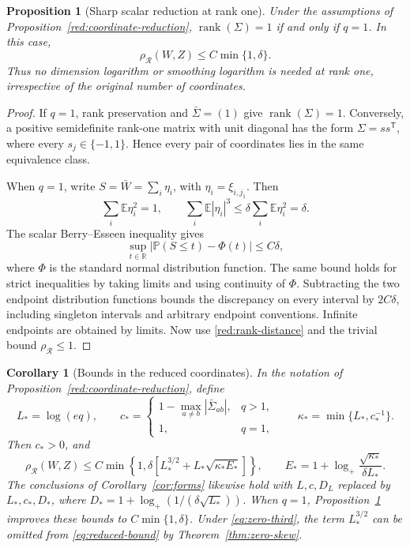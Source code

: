 \documentclass[11pt,a4paper]{article}
\newtheorem{proposition}{Proposition}
\newtheorem{corollary}{Corollary}
\theoremstyle{remark}
\newcommand{\E}{\mathbb E}
\newcommand{\Pp}{\mathbb P}
\newcommand{\R}{\mathbb R}
\newcommand{\rh}{\rho_{\mathcal R}}
\begin{document}
\begin{proposition}[Sharp scalar reduction at rank one]
\label{red:rank-one}
Under the assumptions of Proposition~\ref{red:coordinate-reduction},
\(\operatorname{rank}(\Sigma)=1\) if and only if \(q=1\).  In this case,
\begin{equation}
 \rh(W,Z)\le C\min\{1,\delta\}.
 \label{red:scalar-rate}
\end{equation}
Thus no dimension logarithm or smoothing logarithm is needed at rank
one, irrespective of the original number of coordinates.
\end{proposition}

\begin{proof}
If \(q=1\), rank preservation and \(\bar\Sigma=(1)\) give
\(\operatorname{rank}(\Sigma)=1\).  Conversely, a positive semidefinite
rank-one matrix with unit diagonal has the form
\(\Sigma=ss^{\mathsf T}\), where every \(s_j\in\{-1,1\}\).
Hence every pair of coordinates lies in the same equivalence class.

When \(q=1\), write \(S=\bar W=\sum_i\eta_i\), with
\(\eta_i=\xi_{i,j_1}\).  Then
\[
 \sum_i\E\eta_i^2=1,\qquad
 \sum_i\E|\eta_i|^3
 \le\delta\sum_i\E\eta_i^2=\delta.
\]
The scalar Berry--Esseen inequality gives
\[
 \sup_{t\in\R}|\Pp(S\le t)-\Phi(t)|\le C\delta,
\]
where \(\Phi\) is the standard normal distribution function.  The same
bound holds for strict inequalities by taking limits and using
continuity of \(\Phi\).  Subtracting the two endpoint distribution
functions bounds the discrepancy on every interval by \(2C\delta\),
including singleton intervals and arbitrary endpoint conventions.
Infinite endpoints are obtained by limits.  Now use
\eqref{red:rank-distance} and the trivial bound \(\rh\le1\).
\end{proof}

\begin{corollary}[Bounds in the reduced coordinates]\label{cor:reduced}
In the notation of Proposition~\ref{red:coordinate-reduction}, define
\[
 L_*=\log(eq),\qquad
 c_*=\begin{cases}
 1-\max_{a\ne b}|\bar\Sigma_{ab}|,&q>1,\\
 1,&q=1,
 \end{cases}
 \qquad \kappa_*=\min\{L_*,c_*^{-1}\}.
\]
Then \(c_*>0\), and
\begin{equation}
 \rh(W,Z)\le C\min\!\left\{1,
 \delta\left[L_*^{3/2}+L_*\sqrt{\kappa_*E_*}\right]\right\},
 \qquad E_*=1+\log_+\frac{\sqrt{\kappa_*}}{\delta L_*}.
 \label{eq:reduced-bound}
\end{equation}
The conclusions of Corollary~\ref{cor:forms} likewise hold with
\(L,c,D_L\) replaced by \(L_*,c_*,D_*\), where
\(D_*=1+\log_+(1/(\delta\sqrt{L_*}))\).
When \(q=1\), Proposition~\ref{red:rank-one} improves these bounds to
\(C\min\{1,\delta\}\).
Under \eqref{eq:zero-third}, the term \(L_*^{3/2}\) can be omitted
from \eqref{eq:reduced-bound} by Theorem~\ref{thm:zero-skew}.
\end{corollary}
\end{document}
